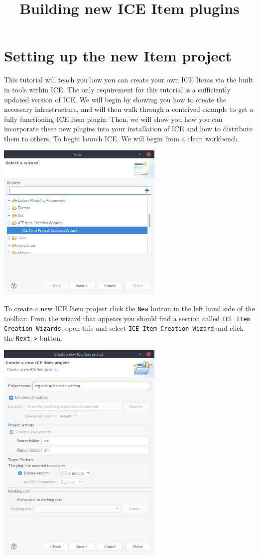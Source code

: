 \documentclass{article}
\begin{document}
\title{Building new ICE Item plugins}

\section{Setting up the new Item project}
This tutorial will teach you how you can create your own ICE Items via the
built in tools within ICE.  The only requirement for this tutorial is a
sufficiently updated version of ICE.  We will begin by showing you how to
create the necessary infrastructure, and will then walk through a contrived
example to get a fully functioning ICE item plugin.  Then, we will show you how
you can incorporate these new plugins into your installation of ICE and how to
distribute them to others.  To begin launch ICE.  We will begin from a clean
workbench.

\begin{center}
\includegraphics[width=8cm]{images/2}
\end{center}

To create a new ICE Item project click the \texttt{New} button in the left hand
side of the toolbar.  From the wizard that appears you should find a section
called \texttt{ICE Item Creation Wizards}; open this and select \texttt{ICE
Item Creation Wizard} and click the \texttt{Next >} button.

\begin{center}
\includegraphics[width=8cm]{images/3}
\end{center}
\end{document}
